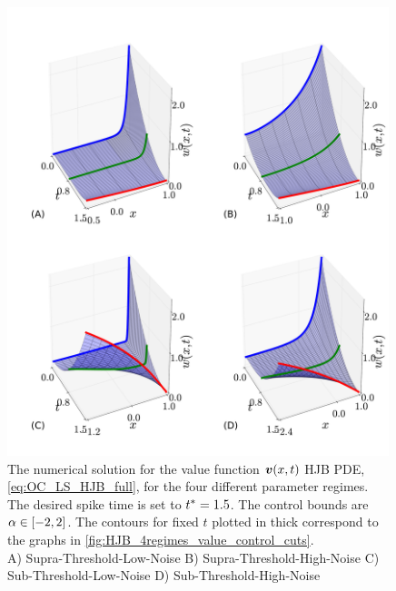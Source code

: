 \documentclass[12pt]{iopart}
\begin{document}
\begin{figure}[h!]
\begin{center}
\includegraphics[width=0.99\textwidth]{Figs/HJB/Regimes_valuesurf.pdf}
\caption{The numerical solution for the value function ${ \boldsymbol{v} }(x,t)$ HJB PDE,
\cref{eq:OC_LS_HJB_full}, for the four different parameter regimes.
The desired spike time is set to ${ t^* }=1.5$.
The control bounds are ${\alpha} \in [-2,2]$.
The contours for fixed $t$ plotted in thick correspond to the graphs in \cref{fig:HJB_4regimes_value_control_cuts}.
\\
A) Supra-Threshold-Low-Noise
B) Supra-Threshold-High-Noise
C) Sub-Threshold-Low-Noise
D) Sub-Threshold-High-Noise  }
\label{fig:HJB_4regimes_value_surf}
\end{center}
\end{figure}
\end{document}

